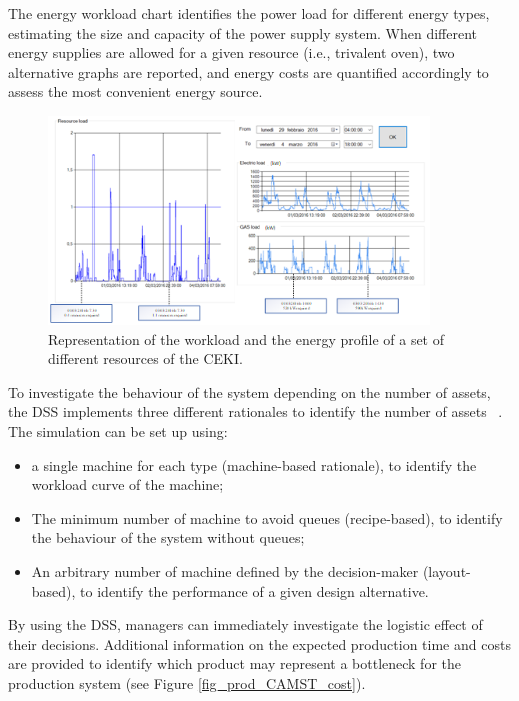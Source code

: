 The energy workload chart identifies the power load for different energy types, estimating the size and capacity of the power supply system. When different energy supplies are allowed for a given resource (i.e., trivalent oven), two alternative graphs are reported, and energy costs are quantified accordingly to assess the most convenient energy source.

\begin{figure}[hbt!]
\centering
\includegraphics[width=0.9\textwidth]{sectionProduction/design_plant_figures/fig_prod_CAMST_workload.png}
\captionsetup{type=figure}
\caption{Representation of the workload and the energy profile of a set of different resources of the CEKI.}
\label{fig_prod_CAMST_workload}
\end{figure}

To investigate the behaviour of the system depending on the number of assets, the DSS implements three different rationales to identify the number of assets ~\cite{Tufano2019_bookChapterPlantDesign}. The simulation can be set up using:

\begin{itemize}
    \item a single machine for each type (machine-based rationale), to identify the workload curve of the machine;
    \item The minimum number of machine to avoid queues (recipe-based), to identify the behaviour of the system without queues;
    \item An arbitrary number of machine defined by the decision-maker (layout-based), to identify the performance of a given design alternative.

\end{itemize}

By using the DSS, managers can immediately investigate the logistic effect of their decisions. Additional information on the expected production time and costs are provided to identify which product may represent a bottleneck for the production system (see Figure \ref{fig_prod_CAMST_cost}).

